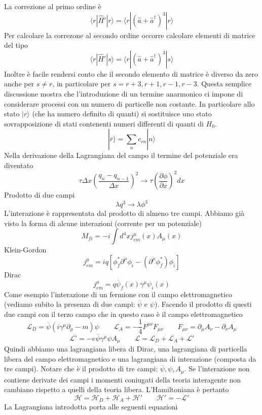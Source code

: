 La correzione al primo ordine è
$$
\langle r | \hat{H}' | r \rangle = \langle r | (\hat{a} + \hat{a}^\dagger)^3 | r \rangle
$$
Per calcolare la correzone al secondo ordine occorre calcolare elementi di matrice del tipo
$$
\langle r | \hat{H}' | s \rangle = \langle r | (\hat{a} + \hat{a}^\dagger)^3 | s \rangle
$$
Inoltre è facile rendersi conto che il secondo elemento di matrice è diverso da zero anche per $s\not=r$, in particolare per $s=r+3,r+1,r-1,r-3$. Questa semplice discussione mostra che l'introduzione di un termine anarmonico ci impone di considerare processi con un numero di particelle non costante. In particolare allo stato $|r\rangle$ (che ha numero definito di quanti) si sostituisce uno stato sovrapposizione di stati contenenti numeri differenti di quanti di $H_0$.
$$
|\overline{r}\rangle = \sum_n c_{rn} |n\rangle
$$
Nella derivazione della Lagrangiana del campo il termine del potenziale era diventato
$$
\tau \Delta x \left( \frac{q_n - q_{n-1}}{\Delta x} \right)^2 \to \tau \left( \frac{\partial \phi}{\partial x} \right)^2 dx
$$
Prodotto di due campi
$$
\lambda q^3 \to \lambda \phi^3
$$
L'interazione è rappresentata dal prodotto di almeno tre campi. Abbiamo già visto la forma di alcune interazioni (corrente per un potenziale)
$$
M_{fi} = -i \int d^4x j_{em}^\mu(x) A_\mu(x)
$$
Klein-Gordon
$$
j_{em}^\mu = iq [\phi_f^* \partial^\mu \phi_i - (\partial^\mu \phi_f^*) \phi_i]
$$
Dirac
$$
j_{em}^\mu = q \overline{\psi}_f(x) \gamma^\mu \psi_i(x)
$$
Come esempio l'interazione di un fermione con il campo elettromagnetico (vediamo subito la presenza di due campi: $\overline{\psi}$ e $\psi$). Facendo il prodotto di questi due campi con il terzo campo che in questo caso è il campo elettromagnetico
$$
\mathcal{L}_D = \overline{\psi}(i\gamma^\mu\partial_\mu - m)\psi \qquad \mathcal{L}_A = -\frac{1}{4} F^{\mu\nu} F_{\mu\nu} \qquad F_{\mu\nu} = \partial_\mu A_\nu - \partial_\nu A_\mu
$$
$$
\mathcal{L}' = -e\overline{\psi}\gamma^\mu\psi A_\mu \qquad \mathcal{L} = \mathcal{L}_D + \mathcal{L}_A + \mathcal{L}'
$$
Quindi abbiamo una lagrangiana libera di Dirac, una lagrangiana di particella libera del campo elettromagnetico e una lagrangiana di interazione (composta da tre campi).
Notare che è il prodotto di tre campi: $\overline{\psi}, \psi, A_\mu$. Se l'interazione non contiene derivate dei campi i momenti coniugati della teoria interagente non cambiano rispetto a quelli della teoria libera. L'Hamiltoniana è pertanto
$$
\mathcal{H} = \mathcal{H}_D + \mathcal{H}_A + \mathcal{H}' \qquad \mathcal{H}' = -\mathcal{L}'
$$
La Lagrangiana introdotta porta alle seguenti equazioni
